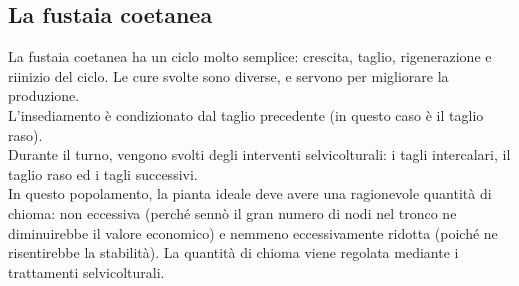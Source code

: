 \documentclass{article}
\begin{document}
\subsection{La fustaia coetanea}
La fustaia coetanea ha un ciclo molto semplice: crescita, taglio, rigenerazione e riinizio del ciclo. Le cure svolte sono diverse, e servono per migliorare la produzione.\\
L'insediamento è condizionato dal taglio precedente (in questo caso è il taglio raso).\\
Durante il turno, vengono svolti degli interventi selvicolturali: i tagli intercalari, il taglio raso ed i tagli successivi.\\
In questo popolamento, la pianta ideale deve avere una ragionevole quantità di chioma: non eccessiva (perché sennò il gran numero di nodi nel tronco ne diminuirebbe il valore economico) e nemmeno eccessivamente ridotta (poiché ne risentirebbe la stabilità). La quantità di chioma viene regolata mediante i trattamenti selvicolturali. 
\end{document}
